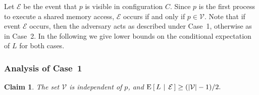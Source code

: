 \documentclass[11pt,letterpaper]{article}
\makeatletter
\providecommand{\@Exp}{{\mathrm{E}}}
\newcommand{\Exp}[2][]{\@Exp_{#1}\left[{#2}\right]}
\newcommand{\CondExp}[3][]{\Exp[#1]{\,#2\,\left\vert\vphantom{#2#3}\right.\,#3\,}}
\newtheorem{claim}[theorem]{Claim}
\newcommand{\EE}{\mathcal{E}}
\newcommand{\VV}{\mathcal{V}}
\makeatother
\begin{document}
Let $\EE$ be the event that $p$ is visible in configuration $C$.
Since $p$ is the first process to execute a shared memory access, $\EE$ occurs if and only if $p\in\VV$.
Note that if event $\EE$ occurs, then the adversary acts as described under Case~1, otherwise as in Case~2.
In the following we give lower bounds on the conditional expectation of $L$ for both cases.
\subsubsection{Analysis of Case~1}
\begin{claim}\label{clm:lb_p_visible}
  The set $\VV$ is independent of $p$, and
  \begin{math}
    \CondExp{L}{\EE}\geq (|\VV|-1)/2.
  \end{math}
\end{claim}
\end{document}
